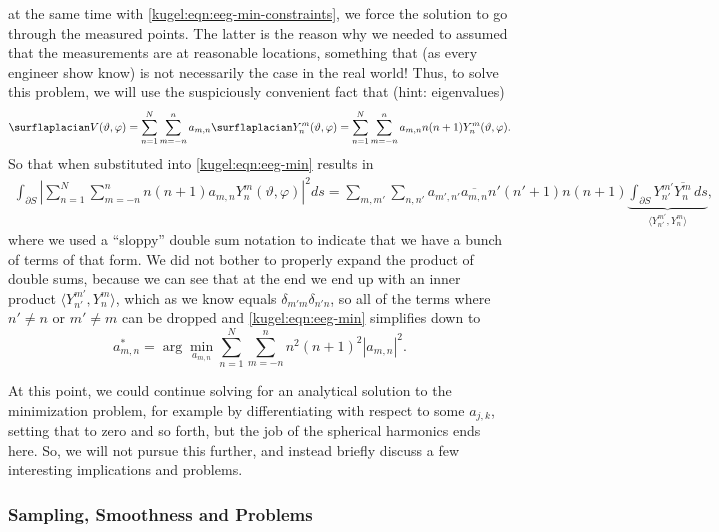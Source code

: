 at the same time with \eqref{kugel:eqn:eeg-min-constraints}, we force the
solution to go through the measured points. The latter is the reason why we
needed to assumed that the measurements are at reasonable locations, something
that (as every engineer show know) is not necessarily the case in the real
world! Thus, to solve this problem, we will use the suspiciously convenient fact
that (hint: eigenvalues)
\begin{equation*}
  \surflaplacian V(\vartheta, \varphi)
    = \sum_{n=1}^N \sum_{m=-n}^n a_{m,n}
      \surflaplacian Y^m_n(\vartheta, \varphi)
    = \sum_{n=1}^N \sum_{m=-n}^n a_{m,n}
      n(n+1) Y^m_n(\vartheta, \varphi).
\end{equation*}
So that when substituted into \eqref{kugel:eqn:eeg-min} results in
\begin{align*}
  \int_{\partial S} \left|
    \sum_{n=1}^N \sum_{m=-n}^n n(n+1) a_{m,n}
    Y^m_n(\vartheta, \varphi)
  \right|^2 ds
  = \sum_{m, m'} \sum_{n, n'} a_{m',n'} \overline{a_{m,n}}
    n'(n'+1) n(n+1)
    \underbrace{\int_{\partial S} Y^{m'}_{n'} \overline{Y^m_n} \, ds}_{
      \langle Y^{m'}_{n'}, Y^m_n \rangle
    },
\end{align*}
where we used a ``sloppy'' double sum notation to indicate that we have a bunch
of terms of that form. We did not bother to properly expand the product of
double sums, because we can see that at the end we end up with an inner product
$\langle Y^{m'}_{n'}, Y^m_n \rangle$, which as we know equals $\delta_{m'm}
\delta_{n'n}$, so all of the terms where $n' \neq n$ or $m' \neq m$ can be
dropped and \eqref{kugel:eqn:eeg-min} simplifies down to
\nocite{pascual-marqui_current_1988}
\begin{equation}
  a^*_{m,n} = \arg \min_{a_{m,n}} 
    \sum_{n=1}^N \sum_{m=-n}^n n^2 (n+1)^2 |a_{m,n}|^2.
\end{equation}

At this point, we could continue solving for an analytical solution to the
minimization problem, for example by differentiating with respect to some
$a_{j,k}$, setting that to zero and so forth, but the job of the spherical
harmonics ends here. So, we will not pursue this further, and instead briefly
discuss a few interesting implications and problems. 

\subsubsection{Sampling, Smoothness and Problems}
\nocite{wingeier_spherical_2001, ruffini_spherical_2002}

